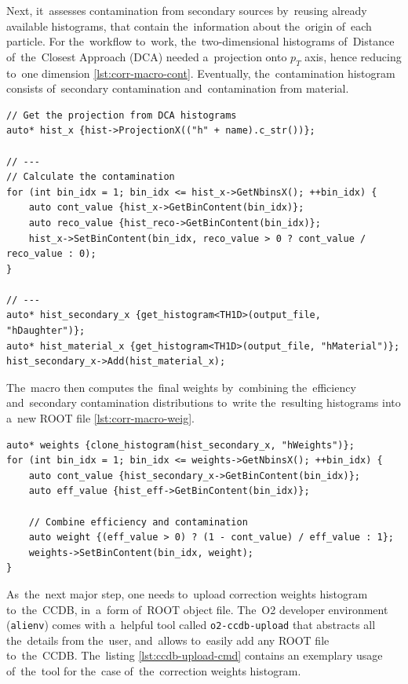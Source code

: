 \documentclass[11pt,a4paper,twoside]{book}
\numberwithin{equation}{chapter}
\begin{document}
Next, it assesses contamination from secondary sources by reusing already available histograms, that contain the information about the origin of each particle. For the workflow to work, the two-dimensional histograms of Distance of the Closest Approach (DCA) needed a projection onto $p_T$ axis, hence reducing to one dimension \ref{lst:corr-macro-cont}. Eventually, the contamination histogram consists of secondary contamination and contamination from material.

\begin{lstlisting}[caption={\label{lst:corr-macro-cont} Snippet of the correction macro - secondary contamination.}]
// Get the projection from DCA histograms
auto* hist_x {hist->ProjectionX(("h" + name).c_str())};

// ---
// Calculate the contamination
for (int bin_idx = 1; bin_idx <= hist_x->GetNbinsX(); ++bin_idx) {
    auto cont_value {hist_x->GetBinContent(bin_idx)};
    auto reco_value {hist_reco->GetBinContent(bin_idx)};
    hist_x->SetBinContent(bin_idx, reco_value > 0 ? cont_value / reco_value : 0);
}

// ---
auto* hist_secondary_x {get_histogram<TH1D>(output_file, "hDaughter")};
auto* hist_material_x {get_histogram<TH1D>(output_file, "hMaterial")};
hist_secondary_x->Add(hist_material_x);
\end{lstlisting}

The macro then computes the final weights by combining the efficiency and secondary contamination distributions to write the resulting histograms into a new ROOT file \ref{lst:corr-macro-weig}.

\begin{lstlisting}[caption={\label{lst:corr-macro-weig} Snippet of the correction macro - correction weights.}]
auto* weights {clone_histogram(hist_secondary_x, "hWeights")};
for (int bin_idx = 1; bin_idx <= weights->GetNbinsX(); ++bin_idx) {
    auto cont_value {hist_secondary_x->GetBinContent(bin_idx)};
    auto eff_value {hist_eff->GetBinContent(bin_idx)};

    // Combine efficiency and contamination
    auto weight {(eff_value > 0) ? (1 - cont_value) / eff_value : 1};
    weights->SetBinContent(bin_idx, weight);
}
\end{lstlisting}

As the next major step, one needs to upload correction weights histogram to the CCDB, in a form of ROOT object file. The O2 developer environment (\verb|alienv|) comes with a helpful tool called \verb|o2-ccdb-upload| that abstracts all the details from the user, and allows to easily add any ROOT file to the CCDB. The listing \ref{lst:ccdb-upload-cmd} contains an exemplary usage of the tool for the case of the correction weights histogram.
\end{document}
